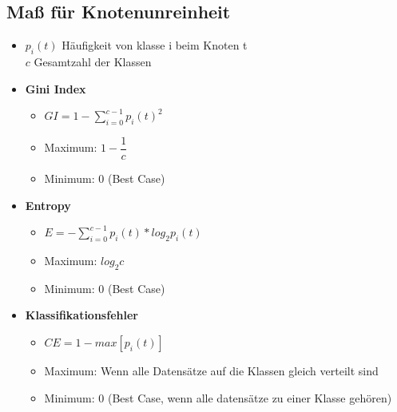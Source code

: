 \documentclass[a4paper]{article}
\begin{document}
\begin{landscape}
\begin{multicols}{3}
        \subsection{Maß für Knotenunreinheit}
        \begin{itemize}[noitemsep,nolistsep]
            \item $p_i(t)$ Häufigkeit von klasse i beim Knoten t\\ $c$ Gesamtzahl der Klassen
            \item \textbf{Gini Index}
                    \begin{itemize}[noitemsep,nolistsep]
                        \item $ GI = 1 - \sum_{i=0}^{c-1} p_i(t)^2$
                        \item Maximum: $1-\dfrac{1}{c}$
                        \item Minimum: 0 (Best Case)
                    \end{itemize}
            \item \textbf{Entropy}
                    \begin{itemize}[noitemsep,nolistsep]
                        \item $ E = - \sum_{i=0}^{c-1} p_i(t) * log_2 p_i(t)$
                        \item Maximum: $log_2 c$
                        \item Minimum: 0 (Best Case)
                    \end{itemize}
            \item \textbf{Klassifikationsfehler}
                    \begin{itemize}[noitemsep,nolistsep]
                        \item $ CE = 1 - max[p_i(t)]$
                        \item Maximum: Wenn alle Datensätze auf die Klassen gleich verteilt sind 
                        \item Minimum: 0 (Best Case, wenn alle datensätze zu einer Klasse gehören)
                    \end{itemize}
        \end{itemize}


\end{multicols}
\end{landscape}
\end{document}
